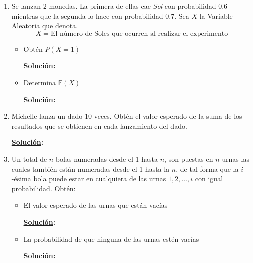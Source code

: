 \documentclass[11pt,letterpaper]{report}
\newcommand{\sol}{\textbf{\underline{Solución}: }} %
\begin{document}
\begin{enumerate}
\begin{itemize}
    \item Prueba que $\mathds{E}(X^2) = \infty$.
    \begin{proof}
        Para el segundo momento, se tiene:
        \begin{align*}
            \mathds{E}[X^2]
                &= \sum_{n=1}^{\infty} n^2 P(X = n) = \sum_{n=1}^{\infty} \frac{4n^2}{n(n+1)(n+2)}\\
                &= \sum_{n=1}^{\infty} \frac{4n}{(n+1)(n+2)}
        \end{align*}
        Y eso diverge, por lo tanto $\mathds{E}(X^2) = \infty$.
    \end{proof}
\end{itemize}

\item Se lanzan 2 monedas. La primera de ellas cae \emph{Sol} con probabilidad 0.6 mientras que la
segunda lo hace con probabilidad 0.7. Sea $X$ la Variable Aleatoria que denota.
$$  X = \text{El número de Soles que ocurren al realizar el experimento} $$
\begin{itemize}
    \item Obtén $P(X = 1)$

    \sol

    \item Determina $\mathds{E}(X)$
    
    \sol
    
\end{itemize}
\item Michelle lanza un dado 10 veces. Obtén el valor esperado de la suma de los resultados que
se obtienen en cada lanzamiento del dado.

\sol

\item Un total de $n$ bolas numeradas desde el 1 hasta $n$, son puestas en $n$ urnas las cuales
también están numeradas desde el 1 hasta la $n$, de tal forma que la $i$-ésima bola puede estar en
cualquiera de las urnas $1,2,\ldots,i$ con igual probabilidad. Obtén:
\begin{itemize}
    \item El valor esperado de las urnas que están vacías
    
    \sol

    \item La probabilidad de que ninguna de las urnas estén vacías
    
    \sol
\end{itemize}


\end{enumerate}
\end{document}
